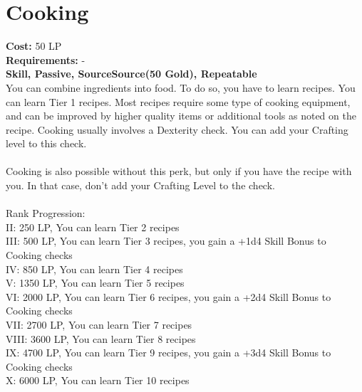 \section{Cooking}\label{perk:cooking}
\textbf{Cost:} 50 LP\\
\textbf{Requirements:} -\\
\textbf{Skill, Passive, SourceSource(50 Gold), Repeatable}\\
You can combine ingredients into food.
To do so, you have to learn recipes.
You can learn Tier 1 recipes.
Most recipes require some type of cooking equipment, and can be improved by higher quality items or additional tools as noted on the recipe.
Cooking usually involves a Dexterity check.
You can add your Crafting level to this check. \\
\\
Cooking is also possible without this perk, but only if you have the recipe with you.
In that case, don't add your Crafting Level to the check.\\
\\
Rank Progression:\\
II: 250 LP, You can learn Tier 2 recipes\\
III: 500 LP, You can learn Tier 3 recipes, you gain a +1d4 Skill Bonus to Cooking checks\\
IV: 850 LP, You can learn Tier 4 recipes\\
V: 1350 LP, You can learn Tier 5 recipes\\
VI: 2000 LP, You can learn Tier 6 recipes, you gain a +2d4 Skill Bonus to Cooking checks\\
VII: 2700 LP, You can learn Tier 7 recipes\\
VIII: 3600 LP, You can learn Tier 8 recipes\\
IX: 4700 LP, You can learn Tier 9 recipes, you gain a +3d4 Skill Bonus to Cooking checks\\
X: 6000 LP, You can learn Tier 10 recipes\\